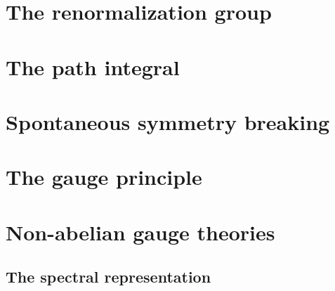 \documentclass[12pt]{memoir}
\begin{document}
\chapter{The renormalization group}

\chapter{The path integral}

\chapter{Spontaneous symmetry breaking}

\chapter{The gauge principle}

\chapter{Non-abelian gauge theories}


\begin{appendices}
  \chapter{The spectral representation}

\end{appendices}

\backmatter{}

% 
\end{document}
